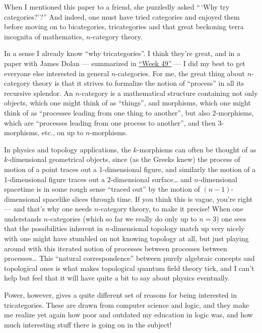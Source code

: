 \documentclass{article}
\begin{document}
When I mentioned this paper to a friend, she puzzledly asked ``\,`Why
try categories?'?'' And indeed, one must have tried categories and
enjoyed them before moving on to bicategories, tricategories and that
great beckoning terra incognita of mathematics, \(n\)-category theory.

In a sense I already know ``why tricategories''. I think they're great,
and in a paper with James Dolan --- summarized in
\protect\hyperlink{week49}{``Week 49''} --- I did my best to get
everyone else interested in general \(n\)-categories. For me, the great
thing about \(n\)-category theory is that it strives to formalize the
notion of ``process'' in all its recursive splendor. An \(n\)-category
is a mathematical structure containing not only objects, which one might
think of as ``things'', and morphisms, which one might think of as
``processes leading from one thing to another'', but also 2-morphisms,
which are ``processes leading from one process to another'', and then
3-morphisms, etc., on up to \(n\)-morphisms.

In physics and topology applications, the \(k\)-morphisms can often be
thought of as \(k\)-dimensional geometrical objects, since (as the
Greeks knew) the process of motion of a point traces out a 1-dimensional
figure, and similarly the motion of a 1-dimensional figure traces out a
2-dimensional surface\ldots{} and \(n\)-dimensional spacetime is in some
rough sense ``traced out'' by the motion of \((n-1)\)-dimensional
spacelike slices through time. If you think this is vague, you're right
--- and that's why one needs \(n\)-category theory, to make it precise!
When one understands \(n\)-categories (which so far we really do only up
to \(n = 3\)) one sees that the possibilities inherent in
\(n\)-dimensional topology match up very nicely with one might have
stumbled on not knowing topology at all, but just playing around with
this iterated notion of processes between processes between
processes\ldots{} This ``natural correspondence'' between purely
algebraic concepts and topological ones is what makes topological
quantum field theory tick, and I can't help but feel that it will have
quite a bit to say about physics eventually.

Power, however, gives a quite different set of reasons for being
interested in tricategories. These are drawn from computer science and
logic, and they make me realize yet again how poor and outdated my
education in logic was, and how much interesting stuff there is going on
in the subject!
\end{document}
